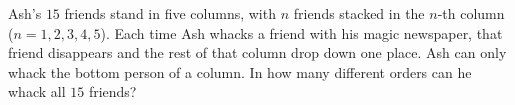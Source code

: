 Ash's $15$ friends stand in five columns, with $n$ friends stacked in the $n$-th column ($n=1,2,3,4,5$). Each time Ash whacks a friend with his magic newspaper, that friend disappears and the rest of that column drop down one place. Ash can only whack the bottom person of a column. In how many different orders can he whack all $15$ friends?

